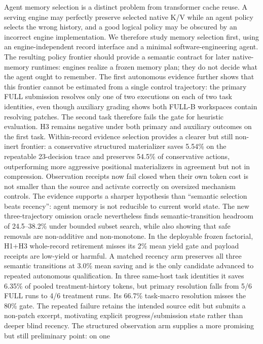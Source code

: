\documentclass[11pt]{article}
\begin{document}
Agent memory selection is a distinct problem from transformer cache reuse. A
serving engine may perfectly preserve selected native K/V while an agent policy
selects the wrong history, and a good logical policy may be obscured by an
incorrect engine implementation. We therefore study memory selection first,
using an engine-independent record interface and a minimal software-engineering
agent. The resulting policy frontier should provide a semantic contract for
later native-memory runtimes: engines realize a frozen memory plan; they do not
decide what the agent ought to remember. The first autonomous evidence further
shows that this frontier cannot be estimated from a single control trajectory:
the primary FULL submission resolves only one of two executions on each of two
task identities, even though auxiliary grading shows both FULL-B workspaces
contain resolving patches. The second task therefore fails the gate for
heuristic evaluation. H3 remains negative under both primary and auxiliary
outcomes on the first task. Within-record evidence selection provides a clearer
but still non-inert frontier: a conservative structured materializer saves
5.54\% on the repeatable 23-decision trace and preserves 54.5\% of conservative
actions, outperforming more aggressive positional materializers in agreement
but not in compression. Observation receipts now fail closed when their own
token cost is not smaller than the source and activate correctly on oversized
mechanism controls. The evidence supports a sharper hypothesis than
``semantic selection beats recency'': agent memory is not reducible to current
world state. The new three-trajectory omission oracle nevertheless finds
semantic-transition headroom of 24.5--38.2\% under bounded subset search, while
also showing that safe removals are non-additive and non-monotone. In the
deployable frozen factorial, H1+H3 whole-record retirement misses its 2\% mean
yield gate and payload receipts are low-yield or harmful. A matched recency arm
preserves all three semantic transitions at 3.0\% mean saving and is the only
candidate advanced to repeated autonomous qualification. In three same-host
task identities it saves 6.35\% of pooled treatment-history tokens, but primary
resolution falls from 5/6 FULL runs to 4/6 treatment runs. Its 66.7\%
task-macro resolution misses the 80\% gate. The repeated failure retains the
intended source edit but submits a non-patch excerpt, motivating explicit
progress/submission state rather than deeper blind recency.  The structured
observation arm supplies a more promising but still preliminary point: on one
\end{document}
